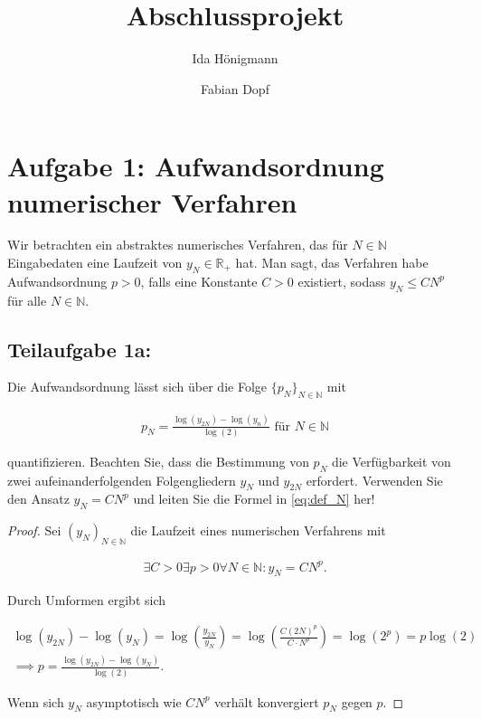 \documentclass[]{article}
\title{Abschlussprojekt}
\author{Ida Hönigmann \and Fabian Dopf}
\begin{document}
\maketitle



\section*{Aufgabe 1: Aufwandsordnung numerischer Verfahren}
Wir betrachten ein abstraktes numerisches Verfahren, das für $N \in \mathbb{N}$ Eingabedaten eine Laufzeit von $y_N \in \mathbb{R}_+$ hat. Man sagt, das Verfahren habe Aufwandsordnung $p > 0$, falls eine Konstante $C > 0$ existiert, sodass $y_N \leq C N^p$ für alle $N \in \mathbb{N}$.

\subsection*{Teilaufgabe 1a:}
Die Aufwandsordnung lässt sich über die Folge $\{p_N\}_{N \in \mathbb{N}}$ mit

\begin{align}
	\label{eq:def_N}
	p_N = \frac{\log(y_{2N})-\log(y_n)}{\log(2)} \text{ für } N \in \mathbb{N}
\end{align}

quantifizieren. Beachten Sie, dass die Bestimmung von $p_N$ die Verfügbarkeit von zwei aufeinanderfolgenden Folgengliedern $y_N$ und $y_{2N}$ erfordert. Verwenden Sie den Ansatz $y_N = CN^p$ und leiten Sie die Formel in \ref{eq:def_N} her!

\begin{proof}
	Sei $(y_N)_{N \in \mathbb{N}}$ die Laufzeit eines numerischen Verfahrens mit
	
	\begin{align*}
		\exists C > 0 \exists p > 0 \forall N \in \mathbb{N}: y_N = CN^p.
	\end{align*}

	Durch Umformen ergibt sich

	\begin{align*}
		\log(y_{2N}) - \log(y_N) = \log\left(\frac{y_{2N}}{y_N}\right) = \log\left(\frac{C(2N)^{p}}{C\cdot N^{p}}\right) = \log(2^{p}) = p \log(2) \\
		\implies p = \frac{\log(y_{2N}) - \log(y_N)}{\log(2)}.
	\end{align*}

	Wenn sich $y_N$ asymptotisch wie $CN^p$ verhält konvergiert $p_N$ gegen $p$.

\end{proof}
\end{document}
